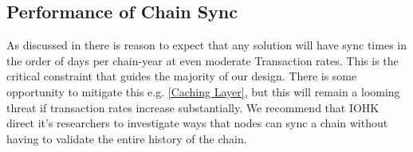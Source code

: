 \documentclass[11pt,a4paper]{article}
\begin{document}
\subsection{Performance of Chain Sync}
As discussed in  there is reason to expect that any solution
will have sync times in the order of days per chain-year at even moderate
Transaction rates. This is the critical constraint that guides the majority of
our design. There is some opportunity to mitigate this e.g. \ref{Caching Layer},
but this will remain a looming threat if transaction rates increase
substantially. We recommend that IOHK direct it's researchers to investigate
ways that nodes can sync a chain without having to validate the entire history
of the chain.



\end{document}
